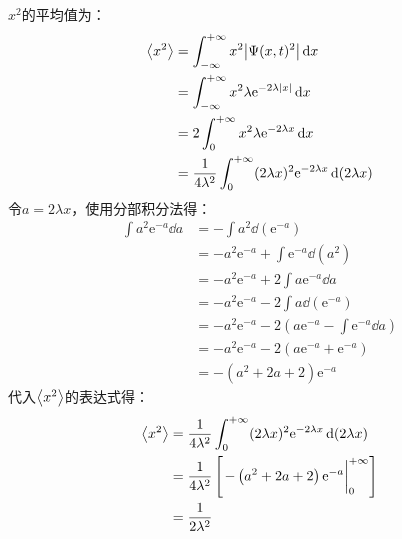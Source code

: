 \documentclass[a4paper,fontset=none]{ctexart}
\begin{document}
\begin{itemize}
        $x^2$的平均值为：
        \begin{align*}
            \expval{x^2}
            &= \int_{-\infty}^{+\infty} x^2 \abs{\Psi(x,t)^2} \dd{x} \\
            &= \int_{-\infty}^{+\infty} x^2 \lambda \mathrm{e}^{-2\lambda|x|} \dd{x} \\
            &= 2 \int_{0}^{+\infty} x^2 \lambda \mathrm{e}^{-2\lambda x} \dd{x} \\
            &= \frac{1}{4\lambda^2} \int_{0}^{+\infty} (2\lambda x)^2 \mathrm{e}^{-2\lambda x} \dd(2\lambda x)
        \end{align*}
        令$a=2\lambda x$，使用分部积分法得：
        \begin{align*}
            \int a^2 \mathrm{e}^{-a} \dd{a}
            &= -\int a^2 \dd(\mathrm{e}^{-a}) \\
            &= -a^2 \mathrm{e}^{-a} + \int \mathrm{e}^{-a} \dd(a^2) \\
            &= -a^2 \mathrm{e}^{-a} + 2 \int a \mathrm{e}^{-a} \dd{a} \\
            &= -a^2 \mathrm{e}^{-a} - 2 \int a \dd(\mathrm{e}^{-a}) \\
            &= -a^2 \mathrm{e}^{-a} - 2 \left(a\mathrm{e}^{-a} - \int \mathrm{e}^{-a} \dd{a}\right) \\
            &= -a^2 \mathrm{e}^{-a} - 2 \left(a\mathrm{e}^{-a} + \mathrm{e}^{-a}\right) \\
            &= -\left(a^2 + 2a + 2\right) \mathrm{e}^{-a}
        \end{align*}
        代入$\expval{x^2}$的表达式得：
        \begin{align*}
            \expval{x^2}
            &= \frac{1}{4\lambda^2} \int_{0}^{+\infty} (2\lambda x)^2 \mathrm{e}^{-2\lambda x} \dd(2\lambda x) \\
            &= \frac{1}{4\lambda^2} \left[\eval{-\left(a^2 + 2a + 2\right) \mathrm{e}^{-a}}_0^{+\infty}\right] \\
            &= \frac{1}{2\lambda^2}
        \end{align*}


\end{itemize}
\end{document}
